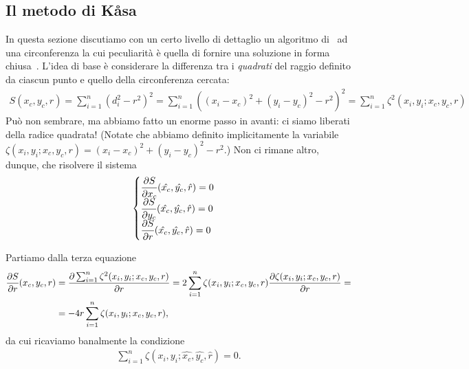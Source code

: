 \subsection{Il metodo di K\r{a}sa}

In questa sezione discutiamo con un certo livello di dettaglio un algoritmo di
\fit\ ad una circonferenza la cui peculiarità è quella di fornire una
 soluzione in forma chiusa~\cite{Kasa1976ACF}.
L'idea di base è considerare la differenza tra i \emph{quadrati} del raggio
definito da ciascun punto e quello della circonferenza cercata:
\begin{align}\label{eq:circle_fit_sum2}
    S(x_c, y_c, r) = \sum_{i=1}^n (d_i^2 - r^2)^2 =
    \sum_{i=1}^n \left( (x_i - x_c)^2 + (y_i - y_c)^2 - r^2 \right)^2 =
    \sum_{i=1}^n \zeta^2(x_i, y_i; x_c, y_c, r)
\end{align}
Può non sembrare, ma abbiamo fatto un enorme passo in avanti: ci siamo liberati
della radice quadrata! (Notate che abbiamo definito implicitamente la variabile
$\zeta(x_i, y_i; x_c, y_c, r) = (x_i - x_c)^2 + (y_i - y_c)^2 - r^2$.)
Non ci rimane altro, dunque, che risolvere il sistema
\begin{align*}
  \begin{cases}
    \displaystyle \pd{S}{x_c}{\hat{x_c}, \hat{y_c}, \hat{r}} = 0\\
    \displaystyle \pd{S}{y_c}{\hat{x_c}, \hat{y_c}, \hat{r}} = 0\\
    \displaystyle \pd{S}{r}{\hat{x_c}, \hat{y_c}, \hat{r}} = 0\\
  \end{cases}
\end{align*}

Partiamo dalla terza equazione
\begin{align*}
  \pd{S}{r}{x_c, y_c, r} &= \pd{\sum_{i=1}^n \zeta^2(x_i, y_i; x_c, y_c, r)}{r}{} =
  2 \sum_{i=1}^n \zeta(x_i, y_i; x_c, y_c, r) \pd{\zeta(x_i, y_i; x_c, y_c, r)}{r}{} =\\
  & = -4r \sum_{i=1}^n \zeta(x_i, y_i; x_c, y_c, r),
\end{align*}
da cui ricaviamo banalmente la condizione
\begin{align}\label{eq:circle_fit_cond3}
  \sum_{i=1}^n \zeta(x_i, y_i; \hat{x_c}, \hat{y_c}, \hat{r}) = 0.
\end{align}

